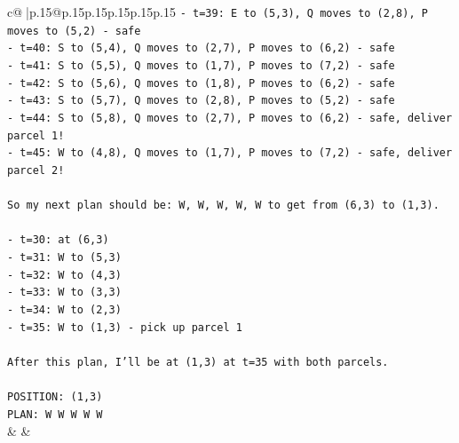 \documentclass{article}
\begin{document}
{\begin{supertabular}{c@{$\;$}|p{.15\linewidth}@{}p{.15\linewidth}p{.15\linewidth}p{.15\linewidth}p{.15\linewidth}p{.15\linewidth}}
{{{\texttt{{-} t=39: E to (5,3), Q moves to (2,8), P moves to (5,2) {-} safe} \\
\texttt{{-} t=40: S to (5,4), Q moves to (2,7), P moves to (6,2) {-} safe} \\
\texttt{{-} t=41: S to (5,5), Q moves to (1,7), P moves to (7,2) {-} safe} \\
\texttt{{-} t=42: S to (5,6), Q moves to (1,8), P moves to (6,2) {-} safe} \\
\texttt{{-} t=43: S to (5,7), Q moves to (2,8), P moves to (5,2) {-} safe} \\
\texttt{{-} t=44: S to (5,8), Q moves to (2,7), P moves to (6,2) {-} safe, deliver parcel 1!} \\
\texttt{{-} t=45: W to (4,8), Q moves to (1,7), P moves to (7,2) {-} safe, deliver parcel 2!} \\
\\ 
\texttt{So my next plan should be: W, W, W, W, W to get from (6,3) to (1,3).} \\
\\ 
\texttt{{-} t=30: at (6,3)} \\
\texttt{{-} t=31: W to (5,3)} \\
\texttt{{-} t=32: W to (4,3)} \\
\texttt{{-} t=33: W to (3,3)} \\
\texttt{{-} t=34: W to (2,3)} \\
\texttt{{-} t=35: W to (1,3) {-} pick up parcel 1} \\
\\ 
\texttt{After this plan, I'll be at (1,3) at t=35 with both parcels.} \\
\\ 
\texttt{POSITION: (1,3)} \\
\texttt{PLAN: W W W W W} \\
            }
        }
    }
    & & \\ \\


\end{supertabular}}
\end{document}
